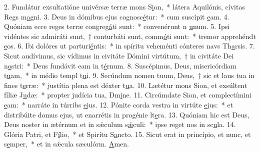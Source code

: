2. Fundátur exsultatióne univérsæ terræ mons S\uline{i}on,~* látera Aquilónis, cívitas Regs m\uline{a}gni.
3. Deus in dómibus ejus cognosc\uline{é}tur:~* cum suscípit \uline{e}am.
4. Quóniam ecce reges terræ congreg\uline{á}ti sunt:~* convenérunt n \uline{u}num.
5. Ipsi vidéntes sic admiráti sunt,~† conturbáti sunt, comm\uline{ó}ti sunt:~* tremor apprehéndt \uline{e}os.
6. Ibi dolóres ut parturi\uline{é}ntis:~* in spíritu veheménti cónteres navs Th\uline{a}rsis.
7. Sicut audívimus, sic vídimus in civitáte Dómini virtútum,~† in civitáte Dei n\uline{o}stri:~* Deus fundávit eam in t\uline{é}rnum.
8. Suscépimus, Deus, misericórdiam t\uline{u}am,~* in médio templ t\uline{u}i.
9. Secúndum nomen tuum, Deus,~† sic et laus tua in fines t\uline{e}rræ:~* justítia plena est déxter t\uline{u}a.
10. Lætétur mons Sion, et exsúltent fíliæ J\uline{u}dæ:~* propter judícia tua, Dm\uline{i}ne.
11. Circúmdate Sion, et complectímini \uline{e}am:~* narráte in túrribs \uline{e}jus.
12. Pónite corda vestra in virtúte \uline{e}jus:~* et distribúite domus ejus, ut enarrétis in progénie lt\uline{e}ra.
13. Quóniam hic est Deus, Deus noster in ætérnum et in sǽculum s\uline{ǽ}culi:~* ipse reget nos in sc\uline{u}la.
14. Glória Patri, et F\uline{í}lio,~* et Spirítu S\uline{a}ncto.
15. Sicut erat in princípio, et nunc, et s\uline{e}mper,~* et in sǽcula sæculórm. \uline{A}men.
